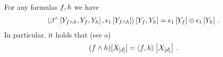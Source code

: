 \begin{theorem}
    \label{the:effectiveConjunction}
    For any formulas $f,h$ we have
    \begin{align*}
        \left\langle 
            \beta^{\land}\left[Y_{f\land h},Y_{f},Y_{h}\right],\epsilon_{1}\left[Y_{f\land h}\right]
        \right\rangle \left[ Y_{f},Y_{h} \right]
        = \epsilon_{1}\left[Y_{f}\right] \otimes \epsilon_{1}\left[Y_{h}\right] \, .
    \end{align*}
    In particular, it holds that (see a)
    \begin{align*}
    (f\land h)[X_{[d]}]
        = \left\langle f,h\right\rangle \left[ X_{[d]} \right] \, .
    \end{align*}
\end{theorem}

